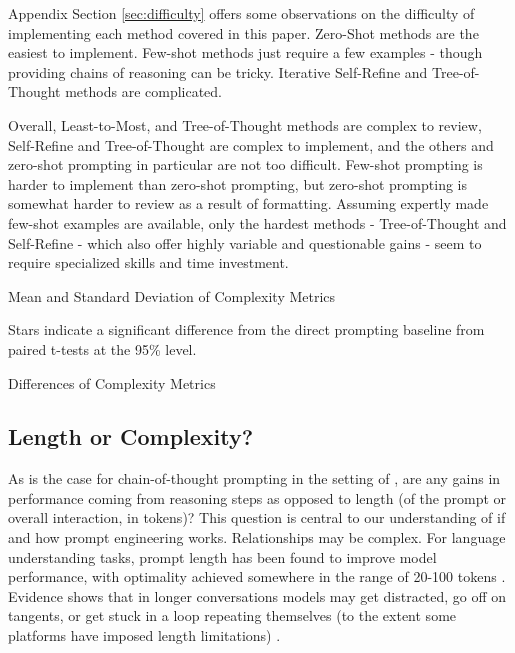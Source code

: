 \documentclass[11pt]{article}
\begin{document}
Appendix Section \ref{sec:difficulty} offers some observations on the difficulty of implementing each method covered in this paper. Zero-Shot methods are the easiest to implement. Few-shot methods just require a few examples - though providing chains of reasoning can be tricky. Iterative Self-Refine and Tree-of-Thought methods are complicated.

Overall, Least-to-Most, and Tree-of-Thought methods are complex to review, Self-Refine and Tree-of-Thought are complex to implement, and the others and zero-shot prompting in particular are not too difficult. Few-shot prompting is harder to implement than zero-shot prompting, but zero-shot prompting is somewhat harder to review as a result of formatting. Assuming expertly made few-shot examples are available, only the hardest methods - Tree-of-Thought and Self-Refine - which also offer highly variable and questionable gains - seem to require specialized skills and time investment.

%


\begin{table}
  \caption{Mean and Standard Deviation of Complexity Metrics}
  \centering
  \tiny
    
  \label{tab:avg_complexity_metrics_pivot}
  \newline \newline \footnotesize Stars indicate a significant difference from the direct prompting baseline from paired t-tests at the 95\% level.
\end{table}

\begin{table}
  \caption{Differences of Complexity Metrics}
  \centering
  \tiny
    
  \label{tab:avg_complexity_diff_metrics_pivot}
\end{table}



\subsection*{Length or Complexity?}

As is the case for chain-of-thought prompting in the setting of \citealp{fu_complexity-based_2023}, are any gains in performance coming from reasoning steps as opposed to length (of the prompt or overall interaction, in tokens)? This question is central to our understanding of if and how prompt engineering works. Relationships may be complex. For language understanding tasks, prompt length has been found to improve model performance, with optimality achieved somewhere in the range of 20-100 tokens \cite{lester_power_2021}. Evidence shows that in longer conversations models may get distracted, go off on tangents, or get stuck in a loop repeating themselves (to the extent some platforms have imposed length limitations) \cite{shi_large_2023, mann_microsoft_nodate}. 
\end{document}
